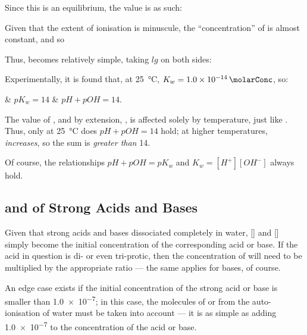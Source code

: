 			Since this is an equilibrium, the \Kc{} value is as such:


			Given that the extent of ionisation is minuscule, the ``concentration'' of  is almost constant, and so


			Thus, \pKw{} becomes relatively simple, taking $lg$ on both sides:


			Experimentally, it is found that, at \SI{25}{\celsius}, $K_{w} = \SI{1.0e-14}{\molarConc}$, so:
			\begin{bulletlist}
				& $pK_{w} = 14$
				& $pH + pOH = 14$.
			\end{bulletlist}

			The value of \Kw{}, and by extension, \pKw{}, is affected solely by temperature, just like \Kc{}. Thus, only at \SI{25}{\celsius}
			does $pH + pOH = 14$ hold; at higher temperatures, \Kw{} \textit{increases}, so the sum is \textit{greater than} \num{14}.

			Of course, the relationships $pH + pOH = pK_{w}$ and $K_{w} = [H^{+}][OH^{-}]$ always hold.



		\pagebreak
		\subsection{\MpH{} and \MpOH{} of Strong Acids and Bases}

			Given that strong acids and bases dissociated completely in water, [] and [] simply become the initial concentration
			of the corresponding acid or base. If the acid in question is di- or even tri-protic, then the concentration of  will need
			to be multiplied by the appropriate ratio --- the same applies for bases, of course.

			An edge case exists if the initial concentration of the strong acid or base is smaller than \SI{1.0e-7}{\molarConc}; in this case,
			the molecules of  or  from the auto-ionisation of water must be taken into account --- it is as simple as adding
			\num{1.0e-7} to the concentration of the acid or base.

